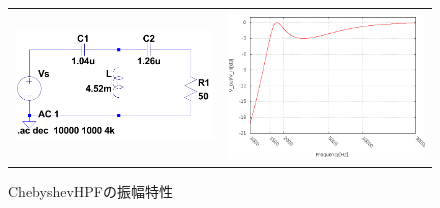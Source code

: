 \documentclass[10pt,a4j,dvipdfmx]{jsarticle}
\begin{document}
 \begin{figure}[H]
     \begin{tabular}{cc}
       \begin{minipage}[t]{0.45\hsize}
         \centering
         \includegraphics[width=8cm]{CheHPF.png}
         \caption{ChebyshevHPF($f_c = 1500$)}
       \end{minipage} &
       \begin{minipage}[t]{0.45\hsize}
         \centering
         \includegraphics[width = 8cm]{CHPF_Vgraf.png}
         \caption{ChebyshevHPFの振幅特性}
       \end{minipage}
     \end{tabular}
   \end{figure}
\end{document}
